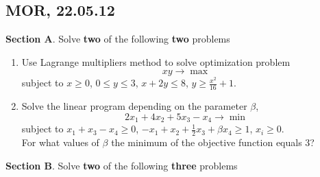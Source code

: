 \documentclass[12pt]{article} %
\theoremstyle{definition} %
\begin{document}

\subsection{MOR, 22.05.12 }

\textbf{Section A}. Solve \textbf{two} of the following \textbf{two} problems

\vspace{12pt}

\begin{enumerate}
\item Use Lagrange multipliers method to solve optimization problem
\[xy\to \max\]
subject to $x\geq 0$, $0\leq y\leq 3$, $x+2y\leq 8$, $y\geq \frac{x^2}{16}+1$.
\item Solve the linear program depending on the parameter $\beta$,
\[2x_1+4x_2+5x_3-x_4\to\min\]
subject to $x_1+x_3-x_4\geq 0$, $-x_1+x_2+\frac{1}{2}x_3+\beta x_4\geq 1$, $x_i\geq 0$.\\
For what values of $\beta$ the minimum of the objective function equals 3?

\end{enumerate}

\vspace{12pt}

\textbf{Section B}. Solve \textbf{two} of the following \textbf{three} problems

\vspace{12pt}
\end{document}
